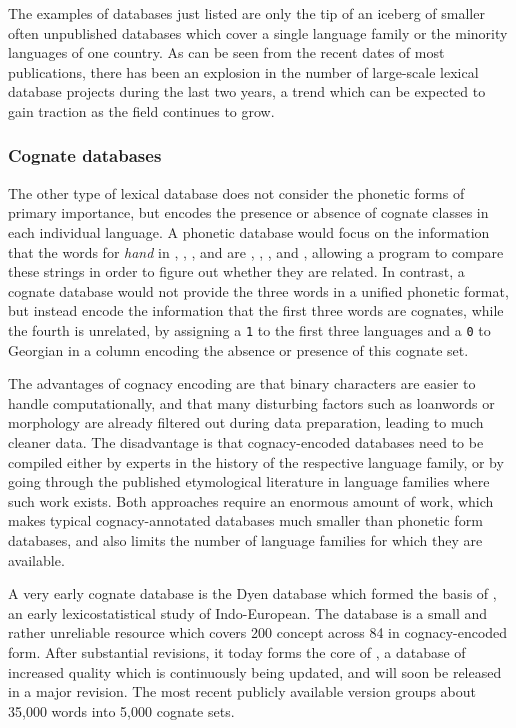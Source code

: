 The examples of databases just listed are only the tip of an iceberg of smaller often unpublished databases which cover a single language family or the minority languages of one country. As can be seen from the recent dates of most publications, there has been an explosion in the number of large-scale lexical database projects during the last two years, a trend which can be expected to gain traction as the field continues to grow.

\subsubsection{Cognate databases}
The other type of lexical database does not consider the phonetic forms of primary importance, but encodes the presence or absence of cognate classes in each individual language. A phonetic database would focus on the information that the words for \textit{hand} in , , , and  are , \ipa{[dOR@]}, \ipa{[CeRi]}, and \ipa{[XElI]}, allowing a program to compare these strings in order to figure out whether they are related. In contrast, a cognate database would not provide the three words in a unified phonetic format, but instead encode the information that the first three words are cognates, while the fourth is unrelated, by assigning a \texttt{1} to the first three languages  and a \texttt{0} to Georgian in a column encoding the absence or presence of this cognate set.

The advantages of cognacy encoding are that binary characters are easier to handle computationally, and that many disturbing factors such as loanwords or morphology are already filtered out during data preparation, leading to much cleaner data. The disadvantage is that cognacy-encoded databases need to be compiled either by experts in the history of the respective language family, or by going through the published etymological literature in language families where such work exists. Both approaches require an enormous amount of work, which makes typical cognacy-annotated databases much smaller than phonetic form databases, and also limits the number of language families for which they are available.

A very early cognate database is the Dyen database which formed the basis of \citet{dyen_ea_1992}, an early lexicostatistical study of Indo-European. The database is a small and rather unreliable resource \citep{geisler_list_2010} which covers 200 concept across 84  in cognacy-encoded form. After substantial revisions, it today forms the core of  \citep{ielex}, a database of increased quality which is continuously being updated, and will soon be released in a major revision. The most recent publicly available version groups about 35,000 words into 5,000 cognate sets.

